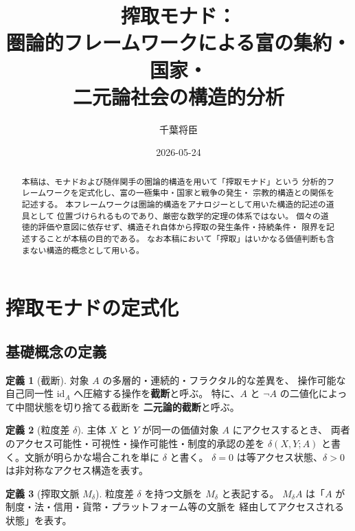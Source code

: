\documentclass[11pt,a4paper]{ltjsarticle}
\newcommand{\Mdelta}{M_\delta}
\theoremstyle{definition}
\newtheorem{definition}{定義}[section]
\begin{document}
\title{搾取モナド：\\
圏論的フレームワークによる富の集約・国家・\\
二元論社会の構造的分析}
\author{千葉将臣}
\date{2026-05-24}
\maketitle

\begin{abstract}
本稿は、モナドおよび随伴関手の圏論的構造を用いて「搾取モナド」という
分析的フレームワークを定式化し、富の一極集中・国家と戦争の発生・
宗教的構造との関係を記述する。
本フレームワークは圏論的構造をアナロジーとして用いた構造的記述の道具として
位置づけられるものであり、厳密な数学的定理の体系ではない。
個々の道徳的評価や意図に依存せず、構造それ自体から搾取の発生条件・持続条件・
限界を記述することが本稿の目的である。
なお本稿において「搾取」はいかなる価値判断も含まない構造的概念として用いる。
\end{abstract}

\tableofcontents
\newpage

\section{搾取モナドの定式化}

\subsection{基礎概念の定義}

\begin{definition}[截断]
対象 $A$ の多層的・連続的・フラクタル的な差異を、
操作可能な自己同一性 $\mathrm{id}_A$ へ圧縮する操作を\textbf{截断}と呼ぶ。
特に、$A$ と $\neg A$ の二値化によって中間状態を切り捨てる截断を
\textbf{二元論的截断}と呼ぶ。
\end{definition}

\begin{definition}[粒度差 $\delta$]
主体 $X$ と $Y$ が同一の価値対象 $A$ にアクセスするとき、
両者のアクセス可能性・可視性・操作可能性・制度的承認の差を
$\delta(X, Y; A)$ と書く。文脈が明らかな場合これを単に $\delta$ と書く。
$\delta = 0$ は等アクセス状態、$\delta > 0$ は非対称なアクセス構造を表す。
\end{definition}

\begin{definition}[搾取文脈 $\Mdelta$]
粒度差 $\delta$ を持つ文脈を $\Mdelta$ と表記する。
$\Mdelta A$ は「$A$ が制度・法・信用・貨幣・プラットフォーム等の文脈を
経由してアクセスされる状態」を表す。
\end{definition}
\end{document}
